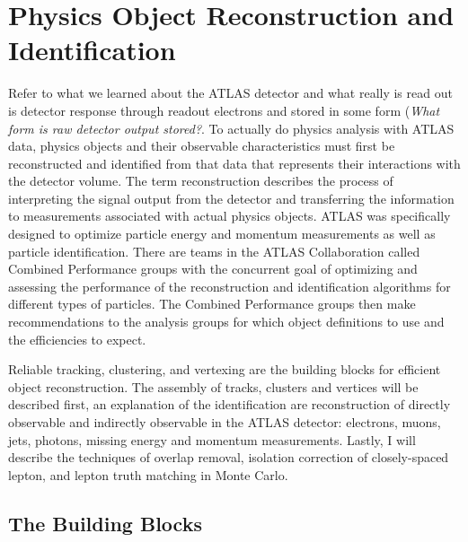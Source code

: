 \chapter{Physics Object Reconstruction and Identification}
Refer to what we learned about the ATLAS detector and what really is read out is detector response through readout electrons and stored in some form (\textit{What form is raw detector output stored?}.  To actually do physics analysis with ATLAS data, physics objects and their observable characteristics must first be reconstructed and identified from that data that represents their interactions with the detector volume.  The term reconstruction describes the process of interpreting the signal output from the detector and transferring the information to measurements associated with actual physics objects.  ATLAS was specifically designed to optimize particle energy and momentum measurements as well as particle identification. There are teams in the ATLAS Collaboration called Combined Performance groups with the concurrent goal of optimizing and assessing the performance of the reconstruction and identification algorithms for different types of particles.  The Combined Performance groups then make recommendations to the analysis groups for which object definitions to use and the efficiencies to expect.

Reliable tracking, clustering, and vertexing are the building blocks for efficient object reconstruction.  The assembly of tracks, clusters and vertices will be described first, an explanation of the identification are reconstruction of directly observable and indirectly observable in the ATLAS detector: electrons, muons, jets, photons, missing energy and momentum measurements.  Lastly, I will describe the techniques of overlap removal, isolation correction of closely-spaced lepton, and lepton truth matching in Monte Carlo.  

\section{The Building Blocks}

